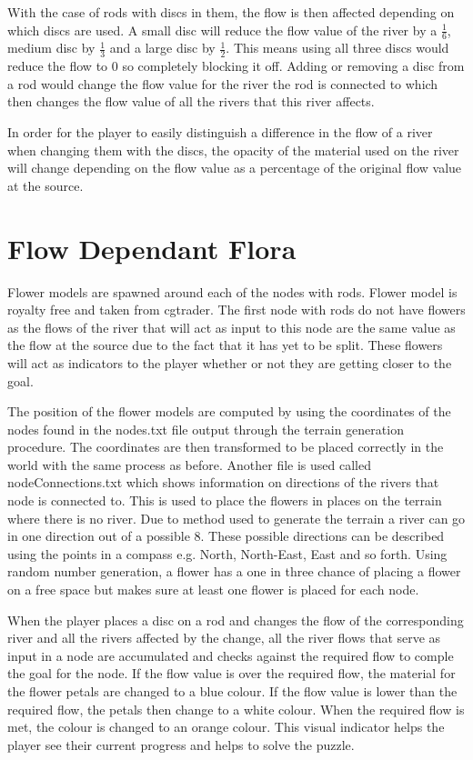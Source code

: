 \newline
\par
With the case of rods with discs in them, the flow is then affected depending on which discs are used. A small disc will reduce the flow value of the river by a \(\frac{1}{6}\), medium disc by \(\frac{1}{3}\) and a large disc by \(\frac{1}{2}\). This means using all three discs would reduce the flow to 0 so completely blocking it off. Adding or removing a disc from a rod would change the flow value for the river the rod is connected to which then changes the flow value of all the rivers that this river affects.
\newline
\par
In order for the player to easily distinguish a difference in the flow of a river when changing them with the discs, the opacity of the material used on the river will change depending on the flow value as a percentage of the original flow value at the source.

\section{Flow Dependant Flora}
Flower models are spawned around each of the nodes with rods. Flower model is royalty free and taken from cgtrader\cite{flowermodel}. The first node with rods do not have flowers as the flows of the river that will act as input to this node are the same value as the flow at the source due to the fact that it has yet to be split. These flowers will act as indicators to the player whether or not they are getting closer to the goal.
\newline
\par
The position of the flower models are computed by using the coordinates of the nodes found in the nodes.txt file output through the terrain generation procedure. The coordinates are then transformed to be placed correctly in the world with the same process as before. Another file is used called nodeConnections.txt which shows information on directions of the rivers that node is connected to. This is used to place the flowers in places on the terrain where there is no river. Due to method used to generate the terrain a river can go in one direction out of a possible 8. These possible directions can be described using the points in a compass e.g. North, North-East, East and so forth. Using random number generation, a flower has a one in three chance of placing a flower on a free space but makes sure at least one flower is placed for each node.
\newline
\par
When the player places a disc on a rod and changes the flow of the corresponding river and all the rivers affected by the change, all the river flows that serve as input in a node are accumulated and checks against the required flow to comple the goal for the node. If the flow value is over the required flow, the material for the flower petals are changed to a blue colour. If the flow value is lower than the required flow, the petals then change to a white colour. When the required flow is met, the colour is changed to an orange colour. This visual indicator helps the player see their current progress and helps to solve the puzzle.

